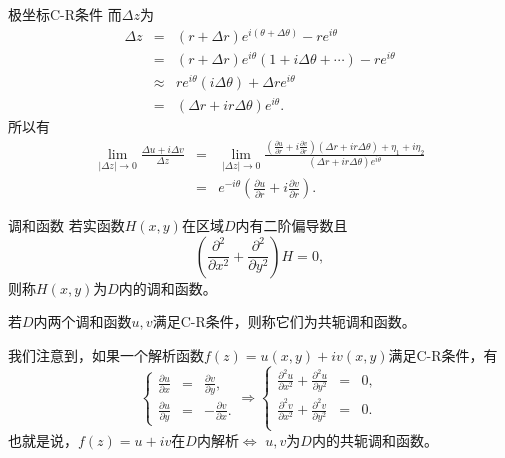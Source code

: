\documentclass[11pt]{beamer}
\newcommand{\kong}[1][0.5]{\vspace{#1cm}}
\begin{document}
\begin{frame}{极坐标C-R条件}
而$\Delta z$为
\begin{eqnarray}
\Delta z &=& (r+\Delta r)e^{i(\theta + \Delta \theta)} - re^{i\theta}
\nonumber\\
&=& (r+\Delta r)e^{i\theta} (1+i\Delta \theta + \cdots) - re^{i\theta}
\nonumber\\
&\approx& re^{i\theta}(i\Delta \theta) + \Delta r e^{i\theta} 
\nonumber\\
&=& (\Delta r + ir \Delta \theta)e^{i\theta}.
\end{eqnarray}
所以有
\begin{eqnarray}
\lim\limits_{|\Delta z| \rightarrow 0} \frac{\Delta u + i\Delta v}{\Delta z}
&=& \lim\limits_{|\Delta z| \rightarrow 0}
\frac{(\frac{\partial u}{\partial r} + i \frac{\partial v}{\partial r})(\Delta r + ir \Delta \theta) + \eta_1 + i\eta_2}{ (\Delta r + ir\Delta \theta)e^{i\theta} } 
\nonumber\\
&=& e^{-i\theta}(\frac{\partial u}{\partial r} + i\frac{\partial v}{\partial r}).
\end{eqnarray}
\end{frame}

\begin{frame}{调和函数}
若实函数$H(x,y)$在区域$D$内有二阶偏导数且
\begin{equation}
(\frac{\partial^2}{\partial x^2} + \frac{\partial^2}{\partial y^2})H = 0,
\end{equation}
则称$H(x,y)$为$D$内的调和函数。

\kong[0.5]
若$D$内两个调和函数$u,v$满足C-R条件，则称它们为共轭调和函数。

\kong[0.5]
我们注意到，如果一个解析函数$f(z)=u(x,y) + iv(x,y)$满足C-R条件，有
\begin{equation}
\left\{
\begin{aligned}
\frac{\partial u }{ \partial x} &=& \frac{\partial v}{\partial y},\\
\frac{\partial u }{ \partial y} &=& - \frac{\partial v}{\partial x}.
\end{aligned}
\right.
\Rightarrow
\left\{
\begin{aligned}
\frac{\partial^2 u}{ \partial x^2} + \frac{\partial^2 u}{\partial y^2} &=& 0,\\
\frac{\partial^2 v}{ \partial x^2} + \frac{\partial^2 v}{\partial y^2} &=& 0.\\
\end{aligned}
\right.
\end{equation}
也就是说，\color{blue}$f(z)=u+iv$在$D$内解析$\Leftrightarrow$ $u,v$为$D$内的共轭调和函数。
\end{frame}
\end{document}
